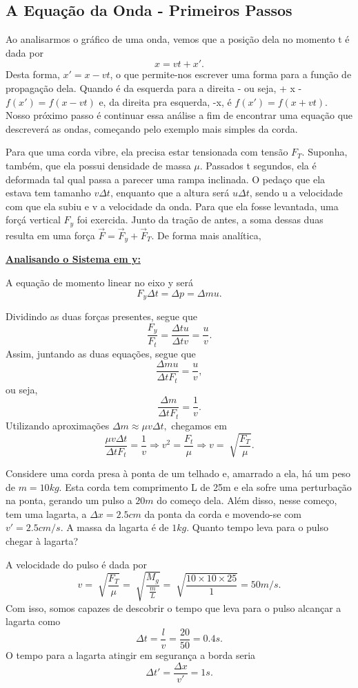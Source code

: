 \documentclass[PhysicsII/physicsII_notes.tex]{subfiles}
\begin{document}
\subsection{A Equação da Onda - Primeiros Passos}
Ao analisarmos o gráfico de uma onda, vemos que a posição dela no momento t é dada por
\[
	x = vt + x'.
\]
Desta forma, \(x' = x - vt\), o que permite-nos escrever uma forma para a função de propagação dela. Quando
é da esquerda para a direita - ou seja, + x - \(f(x') = f(x-vt)\) e, da direita pra esquerda, -x, é \(f(x') = f(x+vt)\).
Nosso próximo passo é continuar essa análise a fim de encontrar uma equação que descreverá as ondas, começando pelo exemplo
mais simples da corda.

Para que uma corda vibre, ela precisa estar tensionada com tensão \(F_{T}\). Suponha, também, que ela possui densidade de massa \(\mu\).
Passados t segundos, ela é deformada tal qual passa a parecer uma rampa inclinada. O pedaço que ela estava tem tamanho
\(v\Delta t\), enquanto que a altura será \(u\Delta t\), sendo u a velocidade com que ela subiu e v a velocidade da onda.
Para que ela fosse levantada, uma forçá vertical \(F_{y}\) foi exercida. Junto da tração de antes, a soma dessas duas resulta em uma
força \(\vec{F} = \vec{F}_{y} + \vec{F}_{T}.\) De forma mais analítica,

\underline{\textbf{Analisando o Sistema em y:}}

A equação de momento linear no eixo y será
\[
	F_{y}\Delta t = \Delta p = \Delta mu.
\]

Dividindo as duas forças presentes, segue que
\[
	\frac{F_{y}}{F_{t}} = \frac{\Delta tu}{\Delta tv} = \frac{u}{v}.
\]
Assim, juntando as duas equações, segue que
\[
	\frac{\Delta m u}{\Delta t F_{t}} = \frac{u}{v},
\]
ou seja,
\[
	\frac{\Delta m}{\Delta t F_{t}} = \frac{1}{v}.
\]
Utilizando aproximações \(\Delta m\approx \mu v\Delta t,\) chegamos em
\[
	\frac{\mu v\Delta t}{\Delta t F_{t}} = \frac{1}{v} \Rightarrow v^{2}=\frac{F_{t}}{\mu} \Rightarrow v = \sqrt[]{\frac{F_{T}}{\mu}}.
\]
\begin{example}
	Considere uma corda presa à ponta de um telhado e, amarrado a ela, há um peso de \(m=10kg\). Esta corda
	tem comprimento L de 25m e ela sofre uma perturbação na ponta, gerando um pulso a \(20m \) do começo dela. Além disso,
	nesse começo, tem uma lagarta, a \(\Delta x = 2.5cm\) da ponta da corda e movendo-se com \(v'=2.5cm/s\). A massa da
	lagarta é de \(1kg\). Quanto tempo leva para o pulso chegar à lagarta?

	A velocidade do pulso é dada por
	\[
		v = \sqrt[]{\frac{F_{T}}{\mu}}=\sqrt[]{\frac{M_{g}}{\frac{m}{L}}} = \sqrt[]{\frac{10\times 10\times 25}{1}}=50m/s.
	\]
	Com isso, somos capazes de descobrir o tempo que leva para o pulso alcançar a lagarta como
	\[
		\Delta t = \frac{l}{v} = \frac{20}{50} = 0.4s.
	\]
	O tempo para a lagarta atingir em segurança a borda seria
	\[
		\Delta t' = \frac{\Delta x}{v'} = 1s.
	\]
\end{example}
\end{document}
